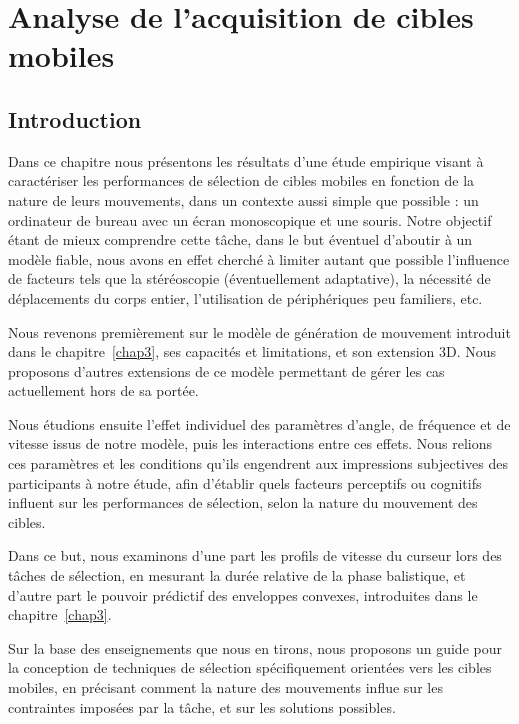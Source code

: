 
\chapter[Analyse de l'acquisition de cibles mobiles]{Analyse de l'acquisition de cibles mobiles}
\minitoc
\label{chap4}
\cleardoublepage

\section{Introduction}
	Dans ce chapitre nous présentons les résultats d'une étude empirique visant à caractériser les performances de sélection de cibles mobiles en fonction de la nature de leurs mouvements, dans un contexte aussi simple que possible : un ordinateur de bureau avec un écran monoscopique et une souris. Notre objectif étant de mieux comprendre cette tâche, dans le but éventuel d'aboutir à un modèle fiable, nous avons en effet cherché à limiter autant que possible l'influence de facteurs tels que la stéréoscopie (éventuellement adaptative), la nécessité de déplacements du corps entier, l'utilisation de périphériques peu familiers, etc. 
	
	Nous revenons premièrement sur le modèle de génération de mouvement introduit dans le chapitre~\ref{chap3}, ses capacités et limitations, et son extension 3D. Nous proposons d'autres extensions de ce modèle permettant de gérer les cas actuellement hors de sa portée.
	
	Nous étudions ensuite l'effet individuel des paramètres d'angle, de fréquence et de vitesse issus de notre modèle, puis les interactions entre ces effets. Nous relions ces paramètres et les conditions qu'ils engendrent aux impressions subjectives des participants à notre étude, afin d'établir quels facteurs perceptifs ou cognitifs influent sur les performances de sélection, selon la nature du mouvement des cibles.

	Dans ce but, nous examinons d'une part les profils de vitesse du curseur lors des tâches de sélection, en mesurant la durée relative de la phase balistique, et d'autre part le pouvoir prédictif des enveloppes convexes, introduites dans le chapitre~\ref{chap3}.
	
	Sur la base des enseignements que nous en tirons, nous proposons un guide pour la conception de techniques de sélection spécifiquement orientées vers les cibles mobiles, en précisant comment la nature des mouvements influe sur les contraintes imposées par la tâche, et sur les solutions possibles.

